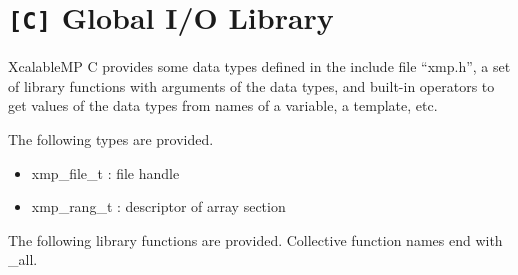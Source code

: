    
   \section{{\tt [C]} Global I/O Library}
   XcalableMP C provides some data types defined in the include file ``xmp.h'',
   a set of library functions with arguments of the data types, and
   built-in operators to get values of the data types from names of a
   variable, a template, etc.

   The following types are provided.

   \begin{itemize}
    \item xmp\_file\_t : file handle
    \item xmp\_rang\_t : descriptor of array section
   \end{itemize}

   The following library functions are provided.
   Collective function names end with \_all.

